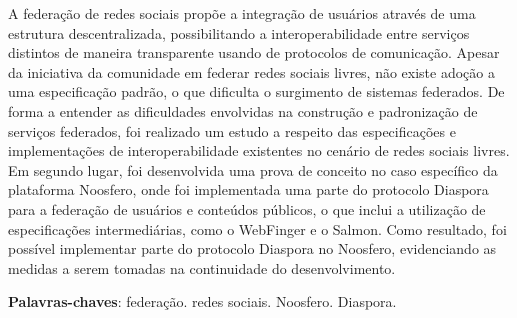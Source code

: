\begin{resumo}[Resumo]
  A federação de redes sociais propõe a integração de usuários através de uma
  estrutura descentralizada, possibilitando a interoperabilidade entre serviços
  distintos de maneira transparente usando de protocolos de comunicação. Apesar da
  iniciativa da comunidade em federar redes sociais livres, não existe adoção a uma
  especificação padrão, o que dificulta o surgimento de sistemas federados. De forma
  a entender as dificuldades envolvidas na construção e padronização de serviços
  federados, foi realizado um estudo a respeito das especificações e implementações
  de interoperabilidade existentes no cenário de redes sociais livres. Em segundo
  lugar, foi desenvolvida uma prova de conceito no caso específico da plataforma
  Noosfero, onde foi implementada uma parte do protocolo Diaspora para a federação
  de usuários e conteúdos públicos, o que inclui a utilização de especificações
  intermediárias, como o WebFinger e o Salmon. Como resultado, foi possível
  implementar parte do protocolo Diaspora no Noosfero, evidenciando as medidas a
  serem tomadas na continuidade do desenvolvimento.

  \vspace{\onelineskip}

  \noindent
  \textbf{Palavras-chaves}: federação. redes sociais. Noosfero. Diaspora.
\end{resumo}
